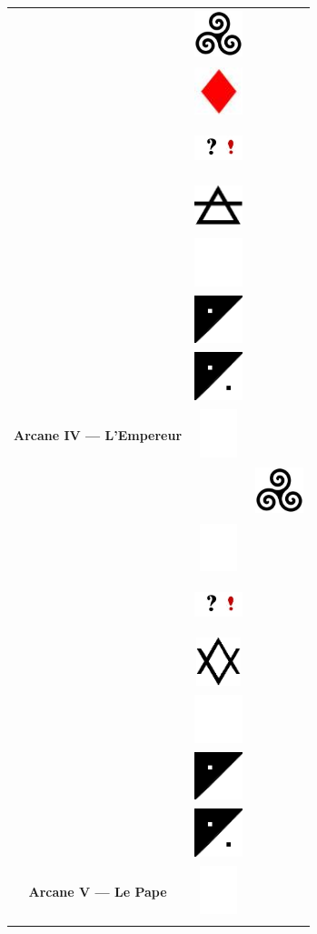 \documentclass[11pt,oneside,a4paper]{article} %
\newcommand{\colornone}{ \includegraphics[width=1.40cm, height=1.40cm]{../../tarotData/img/color_none.jpg} }
\newcommand{\colorcarr}{ \includegraphics[width=1.40cm, height=1.40cm]{../../tarotData/img/color_carreau.jpg} }
\newcommand{\colorinte}{ \includegraphics[width=1.40cm, height=1.40cm]{../../tarotData/img/color_interrexclam.jpg} }
\newcommand{\elementneu}{ \includegraphics[width=1.40cm, height=1.40cm]{../../tarotData/img/element_neutral.jpg} }
\newcommand{\elementair}{ \includegraphics[width=1.40cm, height=1.40cm]{../../tarotData/img/element_air.jpg} }
\newcommand{\tricurve}{ \includegraphics[width=1.40cm, height=1.40cm]{../img/tricurve.jpg} }
\newcommand{\partEmpt}{ \includegraphics[width=1.40cm, height=1.40cm]{../img/CountEmptyPart.png} }
\newcommand{\partHalf}{ \includegraphics[width=1.40cm, height=1.40cm]{../img/CountHalfPart.png} }
\newcommand{\partPlai}{ \includegraphics[width=1.40cm, height=1.40cm]{../img/CountPlainPart.png} }
\begin{document}
\begin{longtable}[ht]{ c c c }
{\begin{tabular}[ht]{ @{}m{4.50cm}@{} @{}p{1.50cm}@{} }
											&	\tricurve		\\
											&	\colorcarr		\\
											&	\colorinte		\\
											&	\elementair		\\
											&	\partEmpt		\\
											&	\partHalf		\\
											&	\partPlai		\\
			\hline
			\textbf{\footnotesize Arcane IV --- L'Empereur}		&	\colornone		\\
		\end{tabular}
	}	&
	\Ovalbox{%
		\begin{tabular}[ht]{ @{}m{4.50cm}@{} @{}p{1.50cm}@{} }
			\multirow{ 7 }{4.45cm}{ \includegraphics[width=4.45cm, height=9.00cm]{../../tarotData/img/5_LePape.jpg} \vfill } 
											&	\tricurve		\\
											&	\colornone		\\
											&	\colorinte		\\
											&	\elementneu		\\
											&	\partEmpt		\\
											&	\partHalf		\\
											&	\partPlai		\\
			\hline
			\textbf{\footnotesize Arcane V --- Le Pape}		&	\colornone		\\
		\end{tabular}
	}	\\
	
	

\end{longtable}
\end{document}
